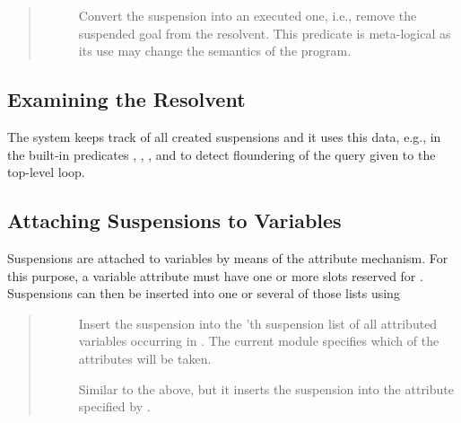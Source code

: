{\begin{quote}
\begin{description}
\item[]
Convert the suspension  into an executed
one, i.e., remove the suspended goal from the resolvent.
This predicate is meta-logical as its use may
change the semantics of the program.
\end{description}
\end{quote}



\subsection{Examining the Resolvent}
The system keeps track of all created suspensions and it
uses this data, e.g., in the built-in predicates
,
,
,
and to detect floundering of the query given to the {\eclipse} top-level loop.



\subsection{Attaching Suspensions to Variables}


Suspensions are attached to variables by means of the attribute mechanism.
For this purpose, a variable attribute must have one or more slots
reserved for .
Suspensions can then be inserted into one or several of those lists using
\begin{quote}
\begin{description}
\item[]
Insert the suspension  into the 'th
suspension list of all attributed variables occurring in .
The current module specifies which of the attributes will be taken.

\item[]
Similar to the above,
but it inserts the suspension into the attribute specified by .
\end{description}
\end{quote}

}
